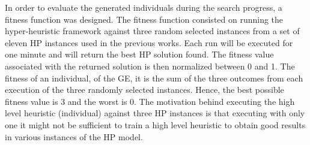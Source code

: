 \documentclass[conference]{IEEEtran}
\begin{document}
In order to evaluate the generated individuals during the search progress, a fitness function was designed. The fitness function consisted on running the hyper-heuristic framework against three random selected instances from a set of eleven HP instances used in the previous works. Each run will be executed for one minute and will return the best HP solution found. The fitness value associated with the returned solution is then normalized between 0 and 1. The fitness of an individual, of the GE, it is the sum of the three outcomes from each execution of the three randomly selected instances. Hence, the best possible fitness value is 3 and the worst is 0.
 The motivation behind executing the high level heuristic (individual) against three HP instances is that executing with only one it might not be sufficient to train a high level heuristic to obtain good results in various instances of the HP model.


\end{document}
